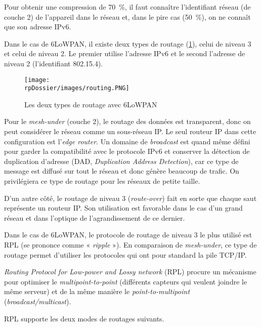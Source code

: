 Pour obtenir une compression de 70~\%, il faut connaître l'identifiant réseau (de couche 2) de l'appareil dans le réseau et, dans le pire cas (50~\%), on ne connaît que son adresse IPv6.

Dans le cas de 6LoWPAN, il existe deux types de routage (\cref{routing}), celui de niveau 3 et celui de niveau 2. Le premier utilise l'adresse IPv6 et le second l'adresse de niveau 2 (l'identifiant 802.15.4).

\begin{figure}[H]
\centering
\texttt{[image: \\rpDossier/images/routing.PNG]}
\caption{Les deux types de routage avec 6LoWPAN}
\label{routing}
\end{figure}

Pour le  \textit{mesh-under} (couche 2), le routage des données est transparent, donc on peut considérer le réseau comme un sous-réseau IP. Le seul routeur IP dans cette configuration est l'\textit{edge router}. Un domaine de \textit{broadcast} est quand même défini pour garder la compatibilité avec le protocole IPv6 et conserver la détection de duplication d'adresse (DAD, \textit{Duplication Address Detection}), car ce type de message est diffusé sur tout le réseau et donc génère beaucoup de trafic. On privilégiera ce type de routage pour les réseaux de petite taille.

D'un autre côté, le routage de niveau 3 (\textit{route-over}) fait en sorte que chaque saut représente un routeur IP. Son utilisation est favorable dans le cas d’un grand réseau et dans l'optique de l'agrandissement de ce dernier. 

Dans le cas de 6LoWPAN, le protocole de routage de niveau 3 le plus utilisé est RPL (se prononce comme « \textit{ripple} »). En comparaison de \textit{mesh-under}, ce type de routage permet d'utiliser les protocoles qui ont pour standard la pile TCP/IP.

\textit{Routing Protocol for Low-power and Lossy network} (RPL) procure un mécanisme pour optimiser le \textit{multipoint-to-point} (différents capteurs qui veulent joindre le même serveur) et de la même manière le \textit{point-to-multipoint} (\textit{broadcast/multicast}).

\noindent RPL supporte les deux modes de routages suivants. 


